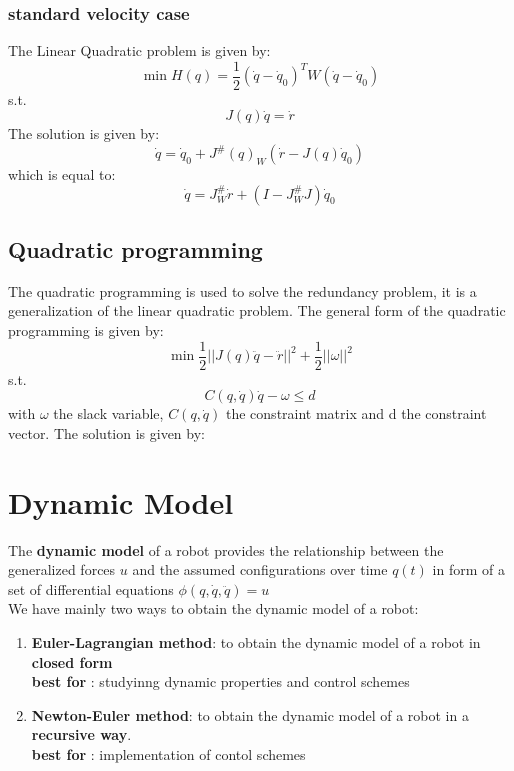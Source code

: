 \documentclass[a4paper,12pt]{article}
\begin{document}
\subsubsection{standard velocity case}
The Linear Quadratic problem is given by:
\begin{equation}
    \min{H(q)} = \frac{1}{2} (\dot{q}-\dot{q}_0)^T W (\dot{q}-\dot{q}_0)
\end{equation} s.t. \begin{equation}
    J(q) \dot{q} = \dot{r}
\end{equation}
The solution is given by:
\begin{equation}
    \dot{q} = \dot{q}_0 + J^{\#}(q)_W (\dot{r}-J(q)\dot{q}_0)
\end{equation}
which is equal to:
\begin{equation}
    \dot{q} = J^{\#}_W\dot{r}+(I - J^{\#}_WJ)\dot{q}_0
\end{equation}
\subsection{Quadratic programming}
The quadratic programming is used to solve the redundancy problem,
it is a generalization of the linear quadratic problem.
The general form of the quadratic programming is given by:
\begin{equation}
    \min \frac{1}{2}||J(q)\ddot{q}-\ddot{r}||^2 + \frac{1}{2}||\omega||^2
\end{equation} s.t. \begin{equation}
    C(q,\dot{q})\dot{q} - \omega \leq d
\end{equation}
with $\omega$ the slack variable, $C(q,\dot{q})$ the constraint 
matrix and d the constraint vector.
The solution is given by:





\section{Dynamic Model}
The \textbf{dynamic model} of a robot provides 
the relationship between the generalized forces $u$ and the
assumed configurations over time $q(t)$ in form of 
a set of differential equations $\phi(q,\dot{q},\ddot{q})=u$\\
We have mainly two ways to obtain the dynamic model of a robot:
\begin{enumerate}
    \item \textbf{Euler-Lagrangian method}: to 
    obtain the dynamic model of a robot in \textbf{closed form} \\
     \textbf{best for }: studyinng 
    dynamic properties and control schemes
    \item \textbf{Newton-Euler method}: to obtain the dynamic model of a robot in 
     a \textbf{recursive way}.\\
     \textbf{best for }: implementation of contol schemes
\end{enumerate}
\end{document}
